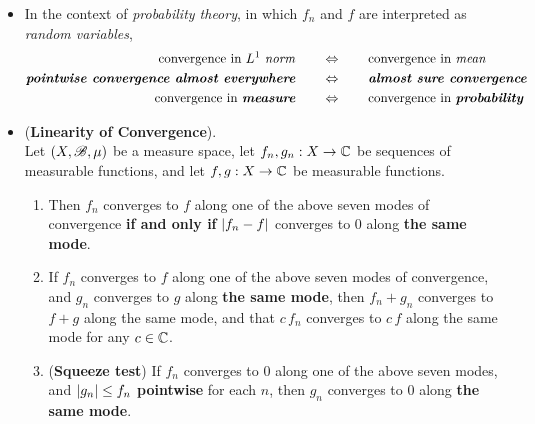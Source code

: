 \documentclass[11pt]{article}
\begin{document}
\begin{itemize}
\item \begin{remark}
In the context of \emph{probability theory}, in which $f_n$ and $f$ are interpreted as \emph{random variables}, \citep{billingsley2008probability, folland2013real}
\begin{align*}
\text{convergence in $L^1$ \emph{norm}} \qquad &\Leftrightarrow \qquad \text{convergence in \emph{mean}}\\
\text{\emph{\textbf{pointwise convergence almost everywhere}}}\qquad  &\Leftrightarrow \qquad \text{\emph{\textbf{almost sure convergence}}}\\
\text{convergence in \emph{\textbf{measure}}} \qquad &\Leftrightarrow  \qquad \text{convergence in \emph{\textbf{probability}}}
\end{align*}
\end{remark}

\item \begin{proposition} (\textbf{Linearity of Convergence}). \citep{tao2011introduction} \\
Let $(X, {\mathscr B}, \mu)$ be a measure space, let $f_n, g_n : X \rightarrow {\mathbb C}$ be sequences of measurable functions, and let $f, g : X \rightarrow {\mathbb C}$ be measurable functions.
\begin{enumerate}
\item Then $f_n$ converges to $f$ along one of the above seven modes of convergence \textbf{if and only if} $\left\lvert f_n - f \right\rvert$ converges to 0
along \textbf{the same mode}.
\item If $f_n$ converges to $f$ along one of the above seven modes of convergence, and $g_n$ converges to $g$ along \textbf{the same mode},
then $f_n + g_n$ converges to $f + g$ along the same mode, and that $c\,f_n$ converges to $c\,f$ along the same mode for any $c \in {\mathbb C}$.
\item (\textbf{Squeeze test}) If $f_n$ converges to $0$ along one of the above seven modes, and $\left\lvert g_n \right\rvert \le f_n$ \textbf{pointwise} for each $n$, then 
$g_n$ converges to $0$ along \textbf{the same mode}.
\end{enumerate}
\end{proposition}
\end{itemize}
\end{document}
